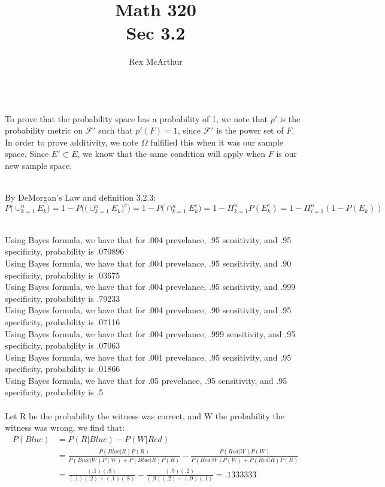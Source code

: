 \documentclass[letterpaper,12pt]{article}
\theoremstyle{definition}
\begin{document}
\title{Math 320\\Sec 3.2}
\author{Rex McArthur}
\maketitle

\\

To prove that the probability space has a probability of 1, we note that $p'$ is the probability metric on $\mathscr{F}'$ such that $p'(F) =1$, since $\mathscr{F}'$ is the power set of $F$.\\
In order to prove additivity, we note  $\Omega$ fulfilled this when it was our sample space. Since $E' \subset E$, we know that the same condition will apply when $F$ is our new sample space. 

\\

By DeMorgan's Law and definition 3.2.3:
\[P \Big( \cup^{n}_{k=1} E_k \Big) = 1 - P \Big(  \Big( \cup^{n}_{k=1} E_k \Big)^c \Big)  = 1 - P  \Big( \cap^{n}_{k=1} E_k^c \Big)  = 1 - \Pi_{k=1}^nP(E_k^c) = 1 - \Pi_{i=1}^n (1-P(E_k))\]

\\
Using Bayes formula, we have that for .004 prevelance, .95 sensitivity, and .95 specificity, probability is .070896\\
Using Bayes formula, we have that for .004 prevelance, .95 sensitivity, and .90 specificity, probability is .03675\\
Using Bayes formula, we have that for .004 prevelance, .95 sensitivity, and .999 specificity, probability is .79233\\
Using Bayes formula, we have that for .004 prevelance, .90 sensitivity, and .95 specificity, probability is .07116\\
Using Bayes formula, we have that for .004 prevelance, .999 sensitivity, and .95 specificity, probability is .07063\\
Using Bayes formula, we have that for .001 prevelance, .95 sensitivity, and .95 specificity, probability is .01866\\
Using Bayes formula, we have that for .05 prevelance, .95 sensitivity, and .95 specificity, probability is .5\\

\\
Let R be the probability the witness was correct, and W the probability the witness was wrong, we find that:
\begin{align*}
    P(Blue) &= P(R|Blue) - P(W|Red)\\
    &= \frac{P(Blue|R)P(R)}{P(Blue|W)P(W) + P(Blue|R)P(R)} - \frac{P(Red|W)P(W)}{P(Red|W)P(W) + P(Red|R)P(R)}\\
    &= \frac{(.1)(.8)}{(.1)(.2) + (.1)(.8)} -  \frac{(.9)(.2)}{(.9)(.2) + (.9)(.1)} = .1333333
\end{align*}
\end{document}
